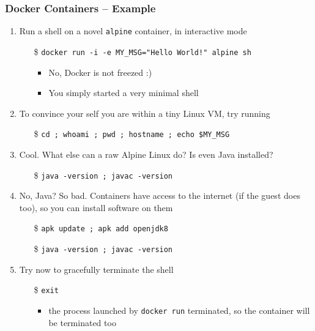 \documentclass{beamer}\mode<presentation>{\usetheme{AMSBolognaFC}}
\begin{document}
\begin{frame}[allowframebreaks]
\frametitle{Docker Containers -- Example}

    \begin{enumerate}
        \item Run a shell on a novel \texttt{alpine} container, in interactive mode
        \begin{itemize}
            \item[\$] \texttt{docker run -i -e MY\_MSG="Hello World!" alpine sh}
            \begin{itemize}
                \item No, Docker is not freezed :)
                \item You simply started a \alert{very minimal} shell
            \end{itemize}
        \end{itemize}
        \item To convince your self you are within a tiny Linux VM, try running
        \begin{itemize}
            \item[\$] \texttt{cd ; whoami ; pwd ; hostname ; echo \$MY\_MSG}
        \end{itemize}
        \item Cool. What else can a raw Alpine Linux do? Is even Java installed?
        \begin{itemize}
            \item[\$] \texttt{java -version ; javac -version}
        \end{itemize}
        \item No, Java? So bad. Containers have access to the internet (if the guest does too), so you can install software on them
        \begin{itemize}
            \item[\$] \texttt{apk update ; apk add openjdk8} 
            \item[\$] \texttt{java -version ; javac -version}
        \end{itemize}

        \framebreak

        \item Try now to gracefully terminate the shell
        \begin{itemize}
            \item[\$] \texttt{exit}
            \begin{itemize}
                \item the process launched by \texttt{docker run} terminated, so the container will be terminated too
            \end{itemize}
        \end{itemize}


\end{enumerate}
\end{frame}
\end{document}
